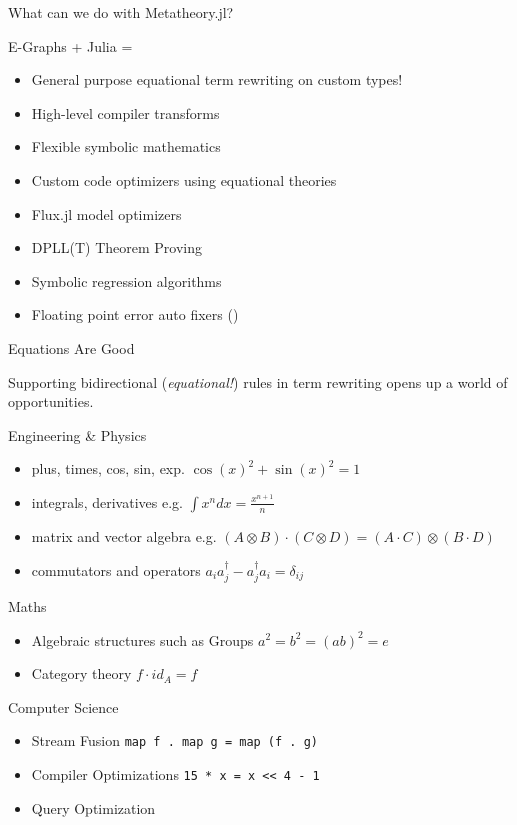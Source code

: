 \documentclass[8pt]{beamer}  %
\newcommand{\MYhref}[3][blue]{\href{#2}{\color{#1}{#3}}}%
\begin{document}
\begin{frame}{What can we do with Metatheory.jl?} %

E-Graphs + Julia = 

\begin{itemize}
    \item General purpose equational term rewriting on custom types!
    \item High-level compiler transforms
    \item Flexible symbolic mathematics
    \item Custom code optimizers using equational theories
    \item Flux.jl model optimizers
    \item DPLL(T) Theorem Proving
    \item Symbolic regression algorithms
    \item Floating point error auto fixers (\MYhref{https://github.com/herbie-fp/egg-herbie}{see here})
\end{itemize}

\end{frame}



\begin{frame}{Equations Are Good}  

Supporting bidirectional (\textit{equational!}) rules in term rewriting opens up a world of opportunities.


Engineering \& Physics
\begin{itemize}
    \item plus, times, cos, sin, exp. $\cos(x)^2 + \sin(x)^2 = 1$ 
    \item integrals, derivatives e.g. $\int x ^ n dx = \frac{x^ {n + 1}}{n} $
    \item matrix and vector algebra e.g. $(A \otimes B) \cdot (C \otimes D) = (A \cdot C) \otimes (B \cdot D)$
    \item commutators and operators $a_i a_j^\dagger - a_j^\dagger a_i = \delta_{ij}$
\end{itemize}
Maths 
\begin{itemize}
   \item Algebraic structures such as Groups $a^2 = b^2 = (ab)^2 = e$
   \item Category theory $f \cdot id_A = f$
\end{itemize}

Computer Science
\begin{itemize}
   \item Stream Fusion \texttt{map f . map g = map (f . g)} 
   \item Compiler Optimizations  \texttt{15 * x = x << 4 - 1} 
   \item Query Optimization
\end{itemize}
\end{frame}
\end{document}
